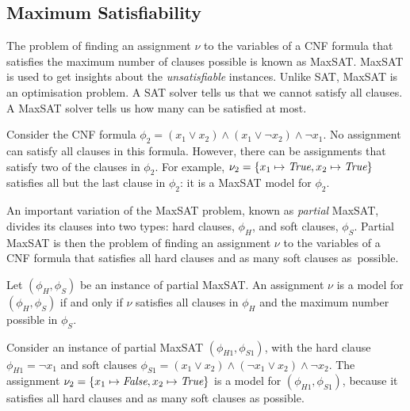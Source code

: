 \subsection{Maximum Satisfiability}
The problem of finding an assignment \(\nu\) to the variables of a CNF formula that satisfies the maximum number of clauses possible is known as \ac{MaxSAT}.
\ac{MaxSAT} is used to get insights about the \textit{unsatisfiable} instances.
Unlike \ac{SAT}, \ac{MaxSAT} is an optimisation problem.
A \ac{SAT} solver tells us that we cannot satisfy all clauses. A \ac{MaxSAT} solver tells us how many can be satisfied at most.

\begin{example}\label{ex:MaxSAT}
Consider the \ac{CNF} formula \(\phi_2 = (x_1 \lor x_2) \land (x_1 \lor \neg x_2) \land \neg x_1\).
No assignment can satisfy all clauses in this formula. 
However, there can be assignments that satisfy two of the clauses in \(\phi_2\).
For example, \(\nu_2 = \{x_1 \mapsto \textit{True}, x_2 \mapsto \textit{True}\}\) satisfies all but the last clause in \(\phi_2\): it is a \ac{MaxSAT} model for \(\phi_2\).
\end{example}

\noindent
An important variation of the \ac{MaxSAT} problem, known as \textit{partial} \ac{MaxSAT}, divides its clauses into two types: hard clauses, \(\phi_H\), and soft clauses, \(\phi_S\).
Partial \ac{MaxSAT} is then the problem of finding an assignment \(\nu\) to the variables of a \ac{CNF} formula that satisfies all hard clauses and as many soft clauses as~possible.

\begin{definition}[Model]
Let \((\phi_H, \phi_S)\) be an instance of partial \ac{MaxSAT}. An assignment \(\nu\) is a model for \((\phi_H, \phi_S)\) if and only if \(\nu\) satisfies all clauses in \(\phi_H\) and the maximum number possible in \(\phi_S\).
\end{definition}

\begin{example}
Consider an instance of partial \ac{MaxSAT} \((\phi_{H1}, \phi_{S1})\), with the hard clause \(\phi_{H1} = \neg x_1\) and soft clauses \(\phi_{S1} = (x_1 \lor x_2) \land (\neg x_1 \lor x_2) \land \neg x_2\).
The assignment \(\nu_2 = \{x_1 \mapsto \textit{False}, x_2 \mapsto \textit{True}\}\) is a model for \((\phi_{H1}, \phi_{S1})\), because it satisfies all hard clauses and as many soft clauses as possible.
\end{example}



